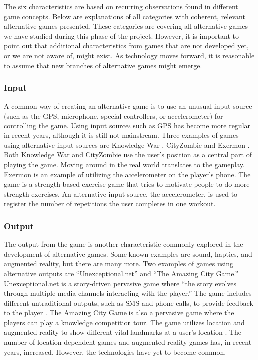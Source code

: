 The six characteristics are based on recurring observations found in different game concepts. Below are explanations of all categories with coherent, relevant alternative games presented. These categories are covering all alternative games we have studied during this phase of the project. However, it is important to point out that additional characteristics from games that are not developed yet, or we are not aware of, might exist. As technology moves forward, it is reasonable to assume that new branches of alternative games might emerge.

\subsubsection{Input}
A common way of creating an alternative game is to use an unusual input source (such as the GPS, microphone, special controllers, or accelerometer) for controlling the game. Using input sources such as GPS has become more regular in recent years, although it is still not mainstream. Three examples of games using alternative input sources are Knowledge War \citep{wang_knowledge_2016}, CityZombie \citep{zhu_experiences_2010} and Exermon \citep{wang_evaluation_2017}. Both Knowledge War and CityZombie use the user’s position as a central part of playing the game. Moving around in the real world translates to the gameplay. Exermon is an example of utilizing the accelerometer on the player's phone. The game is a strength-based exercise game that tries to motivate people to do more strength exercises. An alternative input source, the accelerometer, is used to register the number of repetitions the user completes in one workout. 

\subsubsection{Output}
The output from the game is another characteristic commonly explored in the development of alternative games. Some known examples are sound, haptics, and augmented reality, but there are many more. Two examples of games using alternative outputs are “Unexceptional.net” and “The Amazing City Game.” Unexceptional.net is a story-driven pervasive game where “the story evolves through multiple media channels interacting with the player.” The game includes different untraditional outputs, such as SMS and phone calls, to provide feedback to the player \citep{wang_unexceptionalnet_2009}. The Amazing City Game is also a pervasive game where the players can play a knowledge competition tour. The game utilizes location and augmented reality to show different vital landmarks at a user’s location \citep{wang_pervasive_2011}. The number of location-dependent games and augmented reality games has, in recent years, increased. However, the technologies have yet to become common. 

